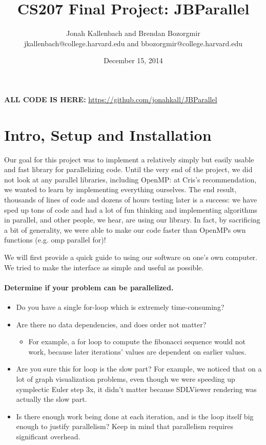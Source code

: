 \documentclass{article}
\title{CS207 Final Project: JBParallel}
\author{Jonah Kallenbach and Brendan Bozorgmir
\\jkallenbach@college.harvard.edu and bbozorgmir@college.harvard.edu}
\date{December 15, 2014}
\begin{document}
\maketitle

\textbf{ALL CODE IS HERE:} \url{https://github.com/jonahkall/JBParallel}

\section{Intro, Setup and Installation}

Our goal for this project was to implement a relatively simply but easily usable and fast library for parallelizing code.  Until the very end of the project, we did not look at any parallel libraries, including OpenMP: at Cris's recommendation, we wanted to learn by implementing everything ourselves.  The end result, thousands of lines of code and dozens of hours testing later is a success: we have sped up tons of code and had a lot of fun thinking and implementing algorithms in parallel, and other people, we hear, are using our library.  In fact, by sacrificing a bit of generality, we were able to make our code faster than OpenMPs own functions (e.g. omp parallel for)!

We will first provide a quick guide to using our software on one's own computer.  We tried to make the interface as simple and useful as possible.
 
\paragraph*{Determine if your problem can be parallelized.}
\begin{itemize}
\item{Do you have a single for-loop which is extremely time-consuming?}
\item Are there no data dependencies, and does order not matter?
\begin{itemize}
	\item For example, a for loop to compute the fibonacci sequence would not work, because later iterations' values are dependent on earlier values.
\end{itemize}

\item Are you sure this for loop is the slow part? For example, we noticed that on a lot of graph visualization problems, even though we were speeding up symplectic Euler step 3x, it didn't matter because SDLViewer rendering was actually the slow part.
\item Is there enough work being done at each iteration, and is the loop itself big enough to justify parallelism? Keep in mind that parallelism requires significant overhead.
\end{itemize}
\end{document}
